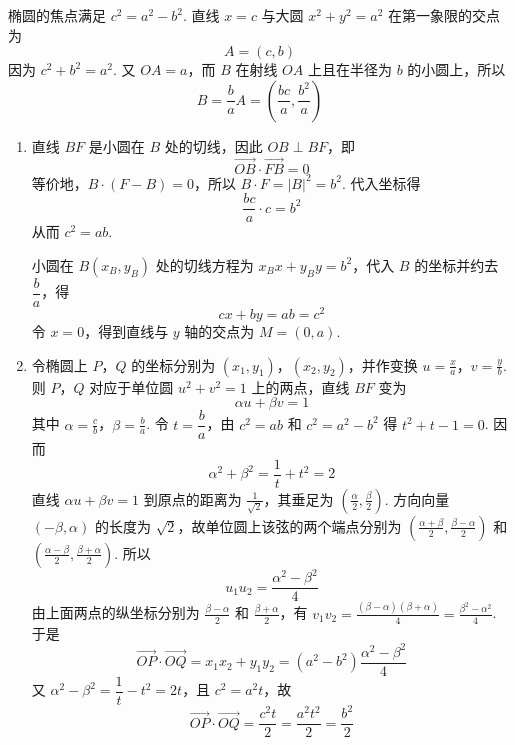 \begin{solution}
椭圆的焦点满足 \(c^{2}=a^{2}-b^{2}\). 直线 \(x=c\) 与大圆 \(x^{2}+y^{2}=a^{2}\) 在第一象限的交点为
\[
A=(c,b)
\]
因为 \(c^{2}+b^{2}=a^{2}\). 又 \(OA=a\)，而 \(B\) 在射线 \(OA\) 上且在半径为 \(b\) 的小圆上，所以
\[
B=\frac{b}{a}A=\left(\frac{bc}{a},\frac{b^{2}}{a}\right)
\]
\begin{enumerate}
\item 直线 \(BF\) 是小圆在 \(B\) 处的切线，因此 \(OB\perp BF\)，即
\[
\overrightarrow{OB}\cdot\overrightarrow{FB}=0
\]
等价地，\(B\cdot(F-B)=0\)，所以 \(B\cdot F=|B|^{2}=b^{2}\). 代入坐标得
\[
\frac{bc}{a}\cdot c=b^{2}
\]
从而 \(c^{2}=ab\).

小圆在 \(B(x_{B},y_{B})\) 处的切线方程为 \(x_{B}x+y_{B}y=b^{2}\)，代入 \(B\) 的坐标并约去 \(\dfrac{b}{a}\)，得
\[
cx+by=ab=c^{2}
\]
令 \(x=0\)，得到直线与 \(y\) 轴的交点为 \(M=(0,a)\).
\item 令椭圆上 \(P\)，\(Q\) 的坐标分别为 \((x_{1},y_{1})\)，\((x_{2},y_{2})\)，并作变换 \(u=\frac{x}{a}\)，\(v=\frac{y}{b}\).
则 \(P\)，\(Q\) 对应于单位圆 \(u^{2}+v^{2}=1\) 上的两点，直线 \(BF\) 变为
\[
\alpha u+\beta v=1
\]
其中 \(\alpha=\frac{c}{b}\)，\(\beta=\frac{b}{a}\).
令 \(t=\dfrac{b}{a}\)，由 \(c^{2}=ab\) 和 \(c^{2}=a^{2}-b^{2}\) 得 \(t^{2}+t-1=0\). 因而
\[
\alpha^{2}+\beta^{2}=\frac1t+t^{2}=2
\]
直线 \(\alpha u+\beta v=1\) 到原点的距离为 \(\frac{1}{\sqrt{2}}\)，其垂足为 \((\frac{\alpha}{2},\frac{\beta}{2})\). 方向向量 \((-\beta,\alpha)\) 的长度为 \(\sqrt{2}\)，故单位圆上该弦的两个端点分别为 \(\left(\frac{\alpha+\beta}{2},\frac{\beta-\alpha}{2}\right)\) 和 \(\left(\frac{\alpha-\beta}{2},\frac{\beta+\alpha}{2}\right)\).
所以
\[
u_{1}u_{2}=\frac{\alpha^{2}-\beta^{2}}{4}
\]
由上面两点的纵坐标分别为 \(\frac{\beta-\alpha}{2}\) 和 \(\frac{\beta+\alpha}{2}\)，有 \(v_{1}v_{2}=\frac{(\beta-\alpha)(\beta+\alpha)}{4}=\frac{\beta^{2}-\alpha^{2}}{4}\).
于是
\[
\overrightarrow{OP}\cdot\overrightarrow{OQ}=x_{1}x_{2}+y_{1}y_{2}=(a^{2}-b^{2})\frac{\alpha^{2}-\beta^{2}}{4}
\]
又 \(\alpha^{2}-\beta^{2}=\dfrac1t-t^{2}=2t\)，且 \(c^{2}=a^{2}t\)，故
\[
\overrightarrow{OP}\cdot\overrightarrow{OQ}=\frac{c^{2}t}{2}=\frac{a^{2}t^{2}}{2}=\frac{b^{2}}{2}
\]
\end{enumerate}
\end{solution}
